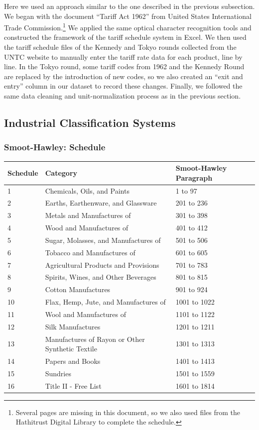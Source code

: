 \documentclass[
  12pt,
]{article}
\begin{document}
Here we used an approach similar to the one described in the previous subsection. We began with the document ``Tariff Act 1962'' from United States International Trade Commission.\footnote{Several pages are missing in this document, so we also used files from the Hathitrust Digital Library to complete the schedule.} We applied the same optical character recognition tools and constructed the framework of the tariff schedule system in Excel. We then used the tariff schedule files of the Kennedy and Tokyo rounds collected from the UNTC website to manually enter the tariff rate data for each product, line by line. In the Tokyo round, some tariff codes from 1962 and the Kennedy Round are replaced by the introduction of new codes, so we also created an ``exit and entry'' column in our dataset to record these changes. Finally, we followed the same data cleaning and unit-normalization process as in the previous section.

\hypertarget{industrial-classification-systems}{%
\subsection{Industrial Classification Systems}\label{industrial-classification-systems}}

\hypertarget{smoot-hawley-schedule}{%
\subsubsection{Smoot-Hawley: Schedule}\label{smoot-hawley-schedule}}

\begin{longtable}[]{@{}lll@{}}
\toprule
Schedule & Category & Smoot-Hawley Paragraph \\
\midrule
\endhead
1 & Chemicals, Oils, and Paints & 1 to 97 \\
2 & Earths, Earthenware, and Glassware & 201 to 236 \\
3 & Metals and Manufactures of & 301 to 398 \\
4 & Wood and Manufactures of & 401 to 412 \\
5 & Sugar, Molasses, and Manufactures of & 501 to 506 \\
6 & Tobacco and Manufactures of & 601 to 605 \\
7 & Agricultural Products and Provisions & 701 to 783 \\
8 & Spirits, Wines, and Other Beverages & 801 to 815 \\
9 & Cotton Manufactures & 901 to 924 \\
10 & Flax, Hemp, Jute, and Manufactures of & 1001 to 1022 \\
11 & Wool and Manufactures of & 1101 to 1122 \\
12 & Silk Manufactures & 1201 to 1211 \\
13 & Manufactures of Rayon or Other Synthetic Textile & 1301 to 1313 \\
14 & Papers and Books & 1401 to 1413 \\
15 & Sundries & 1501 to 1559 \\
16 & Title II - Free List & 1601 to 1814 \\
\bottomrule
\end{longtable}
\end{document}
